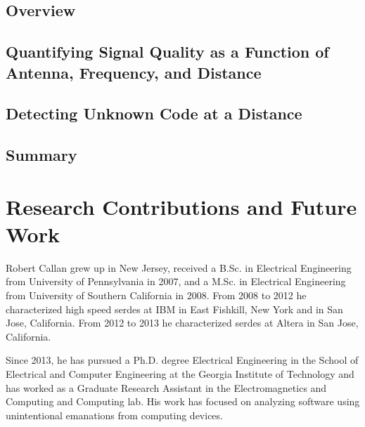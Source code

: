 \documentclass[12pt]{gatech-thesis}
\begin{document}
\section{Overview}
\label{malware-dist-overview}




\section{Quantifying Signal Quality as a Function of Antenna, Frequency, and Distance}
\label{malware-dist-snr}


\section{Detecting Unknown Code at a Distance}
\label{malware-dist-detect}


\section{Summary}
\label{malware-dist-summary}


\chapter{Research Contributions and Future Work}
\label{conclusions}


\appendix
\label{appendix}



\begin{postliminary}
  \begin{comment}
    \postfacesection{Index}{%
    }
  \end{comment}
  \begin{vita}
    Robert Callan grew up in New Jersey, received a B.Sc. in Electrical Engineering from University of Pennsylvania in 2007, and a M.Sc. in Electrical Engineering from University of Southern California in 2008. From 2008 to 2012 he characterized high speed serdes at IBM in East Fishkill, New York and in San Jose, California. From 2012 to 2013 he characterized serdes at Altera in San Jose, California.
    
    Since 2013, he has pursued a Ph.D. degree Electrical Engineering in the School of Electrical and Computer Engineering at the Georgia Institute of Technology and has worked as a Graduate Research Assistant in the Electromagnetics and Computing and Computing lab. His work has focused on analyzing software using unintentional emanations from computing devices. 
  \end{vita}
\end{postliminary}
\end{document}
